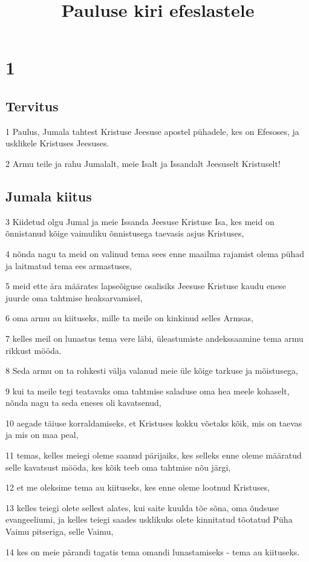 

\title{Pauluse kiri efeslastele}

\chapter{1}

\section*{Tervitus}

\par 1 Paulus, Jumala tahtest Kristuse Jeesuse apostel pühadele, kes on Efesoses, ja usklikele Kristuses Jeesuses.
\par 2 Armu teile ja rahu Jumalalt, meie Isalt ja Issandalt Jeesuselt Kristuselt!

\section*{Jumala kiitus}

\par 3 Kiidetud olgu Jumal ja meie Issanda Jeesuse Kristuse Isa, kes meid on õnnistanud kõige vaimuliku õnnistusega taevasis asjus Kristuses,
\par 4 nõnda nagu ta meid on valinud tema sees enne maailma rajamist olema pühad ja laitmatud tema ees armastuses,
\par 5 meid ette ära määrates lapseõiguse osalisiks Jeesuse Kristuse kaudu enese juurde oma tahtmise heaksarvamisel,
\par 6 oma armu au kiituseks, mille ta meile on kinkinud selles Armsas,
\par 7 kelles meil on lunastus tema vere läbi, üleastumiste andekssaamine tema armu rikkust mööda.
\par 8 Seda armu on ta rohkesti välja valanud meie üle kõige tarkuse ja mõistusega,
\par 9 kui ta meile tegi teatavaks oma tahtmise saladuse oma hea meele kohaselt, nõnda nagu ta seda eneses oli kavatsenud,
\par 10 aegade täiuse korraldamiseks, et Kristuses kokku võetaks kõik, mis on taevas ja mis on maa peal,
\par 11 temas, kelles meiegi oleme saanud pärijaiks, kes selleks enne oleme määratud selle kavatsust mööda, kes kõik teeb oma tahtmise nõu järgi,
\par 12 et me oleksime tema au kiituseks, kes enne oleme lootnud Kristuses,
\par 13 kelles teiegi olete sellest alates, kui saite kuulda tõe sõna, oma õndsuse evangeeliumi, ja kelles teiegi saades usklikuks olete kinnitatud tõotatud Püha Vaimu pitseriga, selle Vaimu,
\par 14 kes on meie pärandi tagatis tema omandi lunastamiseks - tema au kiituseks.

